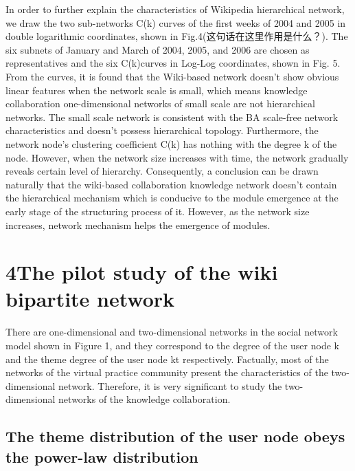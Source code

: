 \documentclass{elsarticle}
\begin{document}
In order to further explain the characteristics of Wikipedia hierarchical network, we draw the two sub-networks C(k) curves of the first weeks of 2004 and 2005 in double logarithmic coordinates, shown in Fig.4(这句话在这里作用是什么？). The six subnets of January and March of 2004, 2005, and 2006 are chosen as representatives and the six C(k)curves in Log-Log coordinates, shown in Fig. 5. From the curves, it is found that the Wiki-based network doesn’t show obvious linear features when the network scale is small, which means knowledge collaboration one-dimensional networks of small scale are not hierarchical networks. The small scale network is consistent with the BA scale-free network characteristics and doesn’t possess hierarchical topology. Furthermore, the network node’s clustering coefficient C(k) has nothing with the degree k of the node. However, when the network size increases with time, the network gradually reveals certain level of hierarchy. Consequently, a conclusion can be drawn naturally that the wiki-based collaboration knowledge network doesn’t contain the hierarchical mechanism which is conducive to the module emergence at the early stage of the structuring process of it. However, as the network size increases, network mechanism helps the emergence of modules. 

\section{4The pilot study of the wiki bipartite network}
\label{sec:4the-pilot-study}

There are one-dimensional and two-dimensional networks in the social
network model shown in Figure 1, and they correspond to the degree of
the user node k and the theme degree of the user node kt
respectively. Factually, most of the networks of the virtual practice
community present the characteristics of the two-dimensional
network. Therefore, it is very significant to study the
two-dimensional networks of the knowledge collaboration. 

\subsection{The theme distribution of the user node obeys the power-law distribution}
\label{sec:theme-distr-user}
\end{document}
